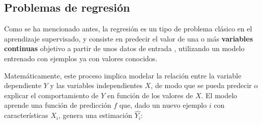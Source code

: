 
    







\subsection{Problemas de regresión}

Como se ha mencionado antes, la regresión es un tipo de problema clásico en el aprendizaje supervisado, y consiste 
en predecir el valor de una o más \textbf{variables continuas} objetivo a partir de unos datos de entrada 
\cite{bishop2006}, utilizando un modelo entrenado con ejemplos ya con valores conocidos.

Matemáticamente, este proceso implica modelar la relación entre la variable dependiente $Y$ y las variables
independientes $X$, de modo que se pueda predecir o explicar el comportamiento de $Y$ en función de los valores 
de $X$. El modelo aprende una función de predicción $f$ que, dado un nuevo ejemplo $i$ con características $X_i$, 
genera una estimación $\hat{Y_i}$:

